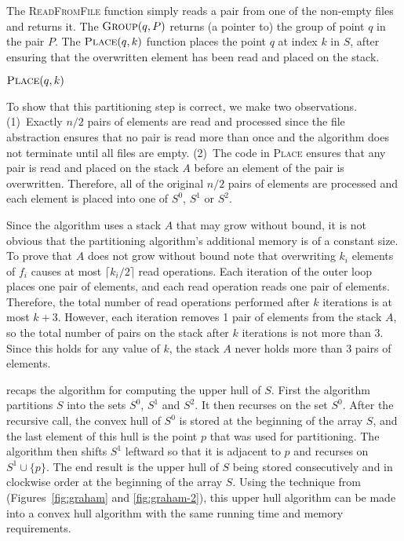 \documentclass{elsart}
\begin{document}
{The \textsc{ReadFromFile} function simply reads a pair from one of the
non-empty files and returns it.  The $\textsc{Group}(q,P)$ returns (a
pointer to) the group of point $q$ in the pair $P$.  The
$\textsc{Place}(q,k)$ function places the point $q$ at index $k$ in
$S$, after ensuring that the overwritten element has been read and
placed on the stack.

\vspace{1ex}\noindent
\begin{minipage}{\textwidth}
$\textsc{Place}(q, k)$
\begin{algorithmic}[1]
  \ENDIF
\ENDFOR
{}
\end{algorithmic}
\end{minipage}
\vspace{1ex}

To show that this partitioning step is correct, we make two
observations.  (1)~Exactly $n/2$ pairs of elements are read and
processed since the file abstraction ensures that no pair is read
more than once and the algorithm does not terminate until all files
are empty.  (2)~The code in \textsc{Place} ensures that any pair is
read and placed on the stack $A$ before an element of the pair is
overwritten.  Therefore, all of the original $n/2$ pairs of elements
are processed and each element is placed into one of $S^0$, $S^1$ or
$S^2$.

Since the algorithm uses a stack $A$ that may grow without bound, it
is not obvious that the partitioning algorithm's additional memory is
of a constant size.  To prove that $A$ does not grow without bound
note that overwriting $k_i$ elements of $f_i$ causes at most $\lceil
k_i/2\rceil$ read operations.  Each iteration of the outer loop places
one pair of elements, and each read operation reads one pair of
elements.  Therefore, the total number of read operations performed
after $k$ iterations is at most $k+3$.  However, each iteration
removes 1 pair of elements from the stack $A$, so the total number of
pairs on the stack after $k$ iterations is not more than 3.  Since
this holds for any value of $k$, the stack $A$ never holds more than 3
pairs of elements.
}

 recaps the algorithm for computing the upper hull of
$S$.  First the algorithm partitions $S$ into the sets $S^0$, $S^1$
and $S^2$.  It then recurses on the set $S^0$.  After the recursive
call, the convex hull of $S^0$ is stored at the beginning of the array
$S$, and the last element of this hull is the point $p$ that was used
for partitioning.  The algorithm then shifts $S^1$ leftward so that it
is adjacent to $p$ and recurses on $S^1\cup\{p\}$.  The end result is
the upper hull of $S$ being stored consecutively and in clockwise
order at the beginning of the array $S$.  Using the technique from
 (Figures~\ref{fig:graham} and \ref{fig:graham-2}),
this upper hull algorithm can be made into a convex hull algorithm
with the same running time and memory requirements.
\end{document}
